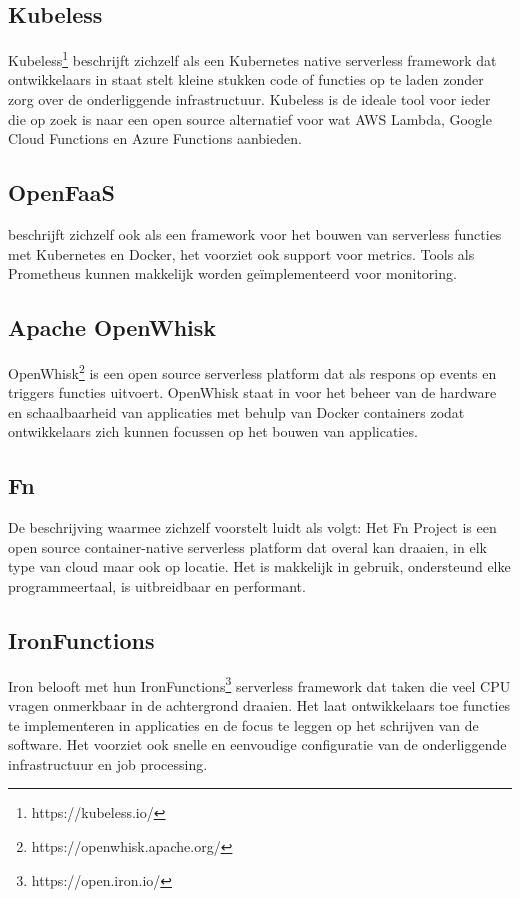 \subsection{Kubeless}
Kubeless\footnote{https://kubeless.io/} beschrijft zichzelf als een Kubernetes native serverless framework dat ontwikkelaars in staat stelt kleine stukken code of functies op te laden zonder zorg over de onderliggende infrastructuur. Kubeless is de ideale tool voor ieder die op zoek is naar een open source alternatief voor wat AWS Lambda, Google Cloud Functions en Azure Functions aanbieden.

\subsection{OpenFaaS}
\textcite{OpenFaaS2019} beschrijft zichzelf ook als een framework voor het bouwen van serverless functies met Kubernetes en Docker, het voorziet ook support voor metrics. Tools als Prometheus kunnen makkelijk worden geïmplementeerd voor monitoring.

\subsection{Apache OpenWhisk}
OpenWhisk\footnote{https://openwhisk.apache.org/} is een open source serverless platform dat als respons op events en triggers functies uitvoert. OpenWhisk staat in voor het beheer van de hardware en schaalbaarheid van applicaties met behulp van Docker containers zodat ontwikkelaars zich kunnen focussen op het bouwen van applicaties.

\subsection{Fn}
De beschrijving waarmee \textcite{FnProject2019} zichzelf voorstelt luidt als volgt: Het Fn Project is een open source container-native serverless platform dat overal kan draaien, in elk type van cloud maar ook op locatie. Het is makkelijk in gebruik, ondersteund elke programmeertaal, is uitbreidbaar en performant. 

\subsection{IronFunctions}
Iron belooft met hun IronFunctions\footnote{https://open.iron.io/} serverless framework dat taken die veel CPU vragen onmerkbaar in de achtergrond draaien. Het laat ontwikkelaars toe functies te implementeren in applicaties en de focus te leggen op het schrijven van de software. Het voorziet ook snelle en eenvoudige configuratie van de onderliggende infrastructuur en job processing.

